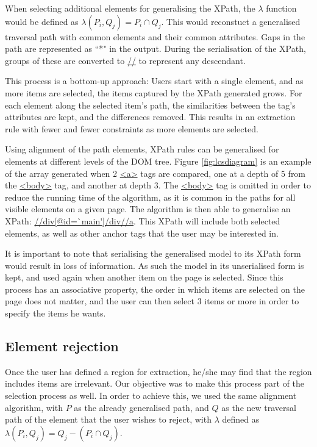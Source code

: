 When selecting additional elements for generalising the XPath, the $\lambda$ function would be defined as $\lambda(P_i,Q_j) = P_i \cap Q_j$. This would reconstuct a generalised traversal path with common elements and their common attributes. Gaps in the path are represented as ``*" in the output. During the serialisation of the XPath, groups of these are converted to \url{//} to represent any descendant.

This process is a bottom-up approach: Users start with a single element, and as more items are selected, the items captured by the XPath generated grows. For each element along the selected item's path, the similarities between the tag's attributes are kept, and the differences removed. This results in an extraction rule with fewer and fewer constraints as more elements are selected.



Using alignment of the path elements, XPath rules can be generalised for elements at different levels of the DOM tree. Figure \ref{fig:lcsdiagram} is an example of the array generated when 2 \url{<a>} tags are compared, one at a depth of 5 from the \url{<body>} tag, and another at depth 3. The \url{<body>} tag is omitted in order to reduce the running time of the algorithm, as it is common in the paths for all visible elements on a given page. The algorithm is then able to generalise an XPath: \url{//div[@id=`main']/div//a}. This XPath will include both selected elements, as well as other anchor tags that the user may be interested in.




It is important to note that serialising the generalised model to its XPath form would result in loss of information. As such the model in its unserialised form is kept, and used again when another item on the page is selected. Since this process has an associative property, the order in which items are selected on the page does not matter, and the user can then select 3 items or more in order to specify the items he wants.

\subsection{Element rejection}

Once the user has defined a region for extraction, he/she may find that the region includes items are irrelevant. Our objective was to make this process part of the selection process as well. In order to achieve this, we used the same alignment algorithm, with $P$ as the already generalised path, and $Q$ as the new traversal path of the element that the user wishes to reject, with $\lambda$ defined as $\lambda(P_i,Q_j) = Q_j - (P_i \cap Q_j)$.


